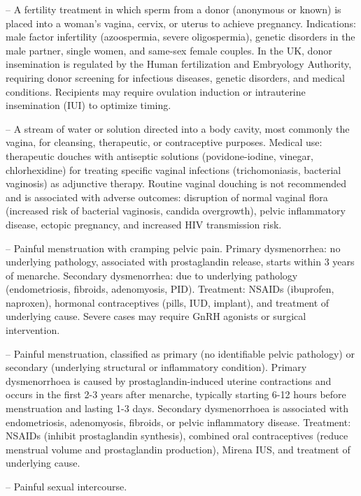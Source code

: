 -- A fertility treatment in which sperm from a donor (anonymous or known) is placed into a woman's vagina, cervix, or uterus to achieve pregnancy. Indications: male factor infertility (azoospermia, severe oligospermia), genetic disorders in the male partner, single women, and same-sex female couples. In the UK, donor insemination is regulated by the Human fertilization and Embryology Authority, requiring donor screening for infectious diseases, genetic disorders, and medical conditions. Recipients may require ovulation induction or intrauterine insemination (IUI) to optimize timing.

-- A stream of water or solution directed into a body cavity, most commonly the vagina, for cleansing, therapeutic, or contraceptive purposes. Medical use: therapeutic douches with antiseptic solutions (povidone-iodine, vinegar, chlorhexidine) for treating specific vaginal infections (trichomoniasis, bacterial vaginosis) as adjunctive therapy. Routine vaginal douching is not recommended and is associated with adverse outcomes: disruption of normal vaginal flora (increased risk of bacterial vaginosis, candida overgrowth), pelvic inflammatory disease, ectopic pregnancy, and increased HIV transmission risk.

-- Painful menstruation with cramping pelvic pain. Primary dysmenorrhea: no underlying pathology, associated with prostaglandin release, starts within 3 years of menarche. Secondary dysmenorrhea: due to underlying pathology (endometriosis, fibroids, adenomyosis, PID). Treatment: NSAIDs (ibuprofen, naproxen), hormonal contraceptives (pills, IUD, implant), and treatment of underlying cause. Severe cases may require GnRH agonists or surgical intervention.

-- Painful menstruation, classified as primary (no identifiable pelvic pathology) or secondary (underlying structural or inflammatory condition). Primary dysmenorrhoea is caused by prostaglandin-induced uterine contractions and occurs in the first 2-3 years after menarche, typically starting 6-12 hours before menstruation and lasting 1-3 days. Secondary dysmenorrhoea is associated with endometriosis, adenomyosis, fibroids, or pelvic inflammatory disease. Treatment: NSAIDs (inhibit prostaglandin synthesis), combined oral contraceptives (reduce menstrual volume and prostaglandin production), Mirena IUS, and treatment of underlying cause.

-- Painful sexual intercourse.

